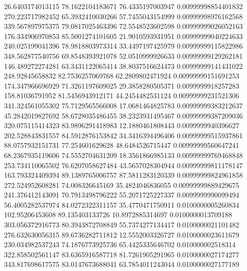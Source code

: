         26.6403174013115        78.1622104183671        76.4335197003947     0.00999998854401832
        270.223717982452        65.3932410030266        57.7455043154999     0.00999998976162568
        339.567897975375        79.0817025463396        72.5548523602598     0.00999999026052163
        176.334906970853        85.5001274101605        21.9010593931951     0.00999999040224633
        240.025199041396        78.9818803973314        33.4497197425979     0.00999999115822986
        348.562877540756        69.8548393921078        52.0510999926633     0.00999999129262181
        146.489272274281        63.3431122065414        38.8037516624473     0.00999999141431022
         248.92845658832        82.7536257069768        62.2809802471924     0.00999999151691253
        174.347966696929        71.3261197609025        29.3858280505371      0.0099999918257283
         158.81036791952        81.5456943912171        44.2454482531124     0.00999999231521306
        341.324561055302        75.7129565566008        17.0681464825783     0.00999999383212637
        45.2842019827692        58.6728035486455        38.2323931495467     0.00999999387209036
        320.075115414323        83.9896291418983        12.1880461808443      0.0099999940396627
        202.528843831557        84.5912876153842        34.3416394496406     0.00999999515937861
        88.0757932151731         77.254601629628        48.6484526715447     0.00999999560647241
        68.2367935119606        74.5552704631209        18.3561866985133     0.00999999769468848
        253.734110065502        76.6207058627484        43.5657028304944     0.00999999811178147
        163.793324409394        89.1389765006757        87.5811283120339     0.00999999824961858
        272.524952608281         74.008326645169        35.4824046836055     0.00999999889429675
        241.376412143091        70.7913498796222        55.2071725227337      0.0099999990099494
        56.4005282537974        84.0272322311157        35.4770471750911      0.0100000005260834
         102.95206453608         89.135403133726        10.8972885314697      0.0100000013709188
        303.056372916773        80.3943872708849        55.7374277134417      0.0100000021101482
        276.632630056315        89.6736282711812        12.5552003326727      0.0100000023611679
        230.034982537243        74.1876773925736        65.4425335646702       0.010000002518314
        322.858502561147        83.6365916587718        81.7261905291965      0.0100000027174277
        343.817698617575        83.0147673688041        63.7854011243044      0.0100000027177189
